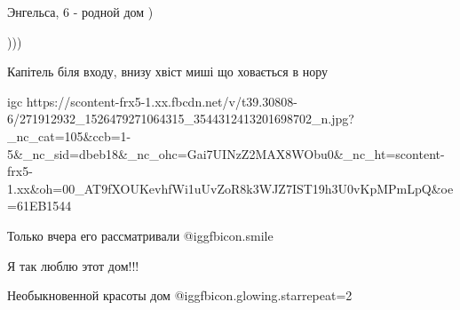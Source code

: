  
 
 
 
 

Энгельса, 6 - родной дом )

)))

Капітель біля входу, внизу хвіст миші що ховається в нору

\ifcmt
  igc https://scontent-frx5-1.xx.fbcdn.net/v/t39.30808-6/271912932_1526479271064315_3544312413201698702_n.jpg?_nc_cat=105&ccb=1-5&_nc_sid=dbeb18&_nc_ohc=Gai7UINzZ2MAX8WObu0&_nc_ht=scontent-frx5-1.xx&oh=00_AT9fXOUKevhfWi1uUvZoR8k3WJZ7IST19h3U0vKpMPmLpQ&oe=61EB1544
\fi

Только вчера его рассматривали @igg{fbicon.smile} 

Я так люблю этот дом!!!

Необыкновенной красоты дом  @igg{fbicon.glowing.star}{repeat=2} 
